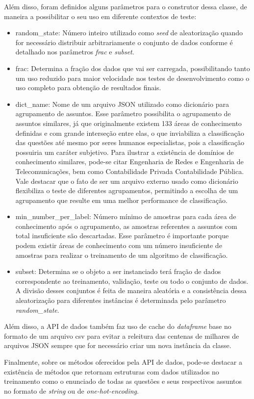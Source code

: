 Além disso, foram definidos alguns parâmetros para o construtor dessa classe, de maneira a possibilitar o seu uso em diferente contextos de teste:

\begin{itemize}

  \item random\_state: Número inteiro utilizado como \textit{seed} de aleatorização quando for necessário distribuir arbitrariamente o conjunto de dados conforme é detalhado nos parâmetros \textit{frac} e \textit{subset}.
  
  \item frac: Determina a fração dos dados que vai ser carregada, possibilitando tanto um uso reduzido para maior velocidade nos testes de desenvolvimento como o uso completo para obtenção de resultados finais.
  
  \item dict\_name: Nome de um arquivo JSON utilizado como dicionário para agrupamento de assuntos. Esse parâmetro possibilita o agrupamento de assuntos similares, já que originalmente existem 133 áreas de conhecimento definidas e com grande interseção entre elas, o que inviabiliza a classificação das questões até mesmo por seres humanos especialistas, pois a classificação possuiria um caráter subjetivo. Para ilustrar a existência de domínios de conhecimento similares, pode-se citar Engenharia de Redes e Engenharia de Telecomunicações, bem como Contabilidade Privada Contabilidade Pública. Vale destacar que o fato de ser um arquivo externo usado como dicionário flexibiliza o teste de diferentes agrupamentos, permitindo a escolha de um agrupamento que resulte em uma melhor performance de classificação.
  
  \item min\_number\_per\_label: Número mínimo de amostras para cada área de conhecimento após o agrupamento, as amostras referentes a assuntos com total insuficiente são descartadas. Esse parâmetro é importante porque podem existir áreas de conhecimento com um número insuficiente de amostras para realizar o treinamento de um algoritmo de classificação.

  \item subset: Determina se o objeto a ser instanciado terá fração de dados correspondente ao treinamento, validação, teste ou todo o conjunto de dados. A divisão desses conjuntos é feita de maneira aleatória e a consistência dessa aleatorização para diferentes instâncias é determinada pelo parâmetro \textit{random\_state}.
  
\end{itemize}

Além disso, a API de dados também faz uso de cache do \textit{dataframe} base no formato de um arquivo csv para evitar a releitura das centenas de milhares de arquivos JSON sempre que for necessário criar um nova instância da classe.

Finalmente, sobre os métodos oferecidos pela API de dados, pode-se destacar a existência de métodos que retornam estruturas com dados utilizados no treinamento como o enunciado de todas as questões e seus respectivos assuntos no formato de \textit{string} ou de \textit{one-hot-encoding}. 